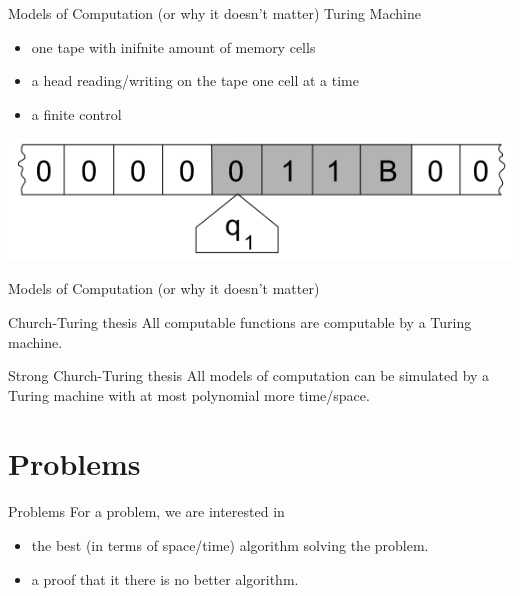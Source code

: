 \documentclass[c]{beamer}
\begin{document}
\begin{frame}{Models of Computation (or why it doesn't matter)}  
Turing Machine

 \begin{itemize}
			\item one tape with inifnite amount of memory cells
			\item a head reading/writing on the tape one cell at a time
			\item a finite control
 \end{itemize}
 
\begin{center}
 \includegraphics[scale=0.3]{images/tm.png} 
\end{center}
\end{frame}	

\begin{frame}{Models of Computation (or why it doesn't matter)}  
	\begin{block}{ Church-Turing thesis }
		All computable functions are computable by a Turing machine.
    \end{block}
    \begin{block}{ Strong Church-Turing thesis }
		All models of computation can be simulated by a Turing machine with at most polynomial more time/space.
    \end{block}
\end{frame}

\section{Problems}
\begin{frame}{Problems}
         For a problem, we are interested in
         \begin{itemize}
			\item the best (in terms of space/time) algorithm solving the problem.
			\item a proof that it there is no better algorithm.
		\end{itemize}	  
	
\end{frame}
\end{document}
